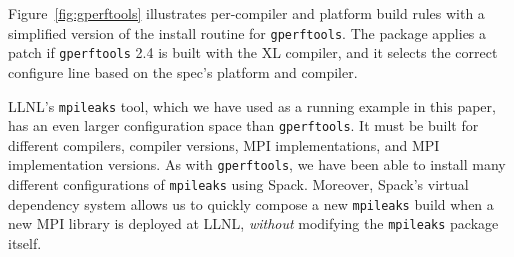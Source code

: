 Figure~\ref{fig:gperftools} illustrates per-compiler and platform build rules with
a simplified version of the install routine for {\tt gperftools}.
The package applies a patch if {\tt gperftools} 2.4 is built with the XL compiler,
and it selects the correct configure line based on the spec's platform and compiler.

LLNL's {\tt mpileaks} tool, which we have used as a running example in this paper,
has an even larger configuration space than {\tt gperftools}.  It must be built
for different compilers, compiler versions, MPI implementations, and MPI implementation
versions. As with {\tt gperftools}, we have been able to install many different
configurations of {\tt mpileaks} using Spack.  Moreover, Spack's virtual dependency system
allows us to
quickly compose a new {\tt mpileaks} build when a new MPI library is deployed at LLNL, {\it without}
modifying the {\tt mpileaks} package itself.

